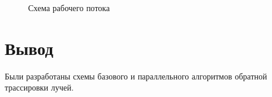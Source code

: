 \begin{figure}[h!]
	
	
	\caption{Схема рабочего потока}
	
	\label{fig:trass_count}
	
\end{figure}



\section*{Вывод}

Были разработаны схемы базового и параллельного алгоритмов обратной трассировки лучей.


